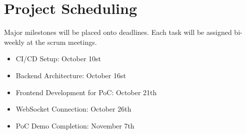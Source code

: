 \documentclass{article}
\begin{document}
\section{Project Scheduling}

Major milestones will be placed onto deadlines. Each task will be assigned bi-weekly at the scrum meetings.

\begin{itemize} 
    \item CI/CD Setup: October 10st
    \item Backend Architecture: October 16st
    \item Frontend Development for PoC: October 21th
    \item WebSocket Connection: October 26th
    \item PoC Demo Completion: November 7th
\end{itemize}
\end{document}
